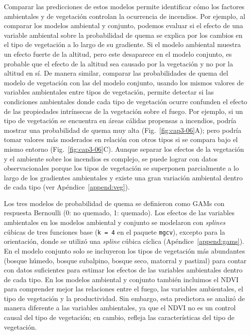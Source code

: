\noindent Comparar las predicciones de estos modelos permite identificar cómo los factores ambientales y de vegetación controlan la ocurrencia de incendios. Por ejemplo, al comparar los modelos ambiental y conjunto, podemos evaluar si el efecto de una variable ambiental sobre la probabilidad de quema se explica por los cambios en el tipo de vegetación a lo largo de su gradiente. Si el modelo ambiental muestra un efecto fuerte de la altitud, pero este desaparece en el modelo conjunto, es probable que el efecto de la altitud sea causado por la vegetación y no por la altitud en sí. De manera similar, comparar las probabilidades de quema del modelo de vegetación con las del modelo conjunto, usando los mismos valores de variables ambientales entre tipos de vegetación, permite detectar si las condiciones ambientales donde cada tipo de vegetación ocurre confunden el efecto de las propiedades intrínsecas de la vegetación sobre el fuego. Por ejemplo, si un tipo de vegetación se encuentra en áreas cálidas propensas a incendios, podría mostrar una probabilidad de quema muy alta (Fig.~\ref{fig:cap3-06}A); pero podría tomar valores más moderados en relación con otros tipos si se compara bajo el mismo entorno (Fig.~\ref{fig:cap3-06}C). Aunque separar los efectos de la vegetación y el ambiente sobre los incendios es complejo, se puede lograr con datos observacionales porque los tipos de vegetación se superponen parcialmente a lo largo de los gradientes ambientales y existe una gran variación ambiental dentro de cada tipo (ver Apéndice~\ref{append:veg}). 

Los tres modelos de probabilidad de quema se definieron como GAMs con respuesta Bernoulli (0: no quemado, 1: quemado). Los efectos de las variables ambientales en los modelos ambiental y conjunto se modelaron con \textit{splines} cúbicas de tres funciones base (\texttt{k = 4} en el paquete \texttt{mgcv}), excepto para la orientación, donde se utilizó una \textit{spline} cúbica cíclica (Apéndice~\ref{append:gams}). En el modelo conjunto solo se incluyeron los tipos de vegetación más abundantes (bosque húmedo, bosque subalpino, bosque seco, matorral y pastizal) para contar con datos suficientes para estimar los efectos de las variables ambientales dentro de cada tipo. En los modelos ambiental y conjunto también incluimos el NDVI para comprender mejor las relaciones entre el fuego, las variables ambientales, el tipo de vegetación y la productividad. Sin embargo, esta predictora se analizó de manera diferente a las variables ambientales, ya que el NDVI no es un control causal del tipo de vegetación; en cambio, refleja las características del tipo de vegetación.

